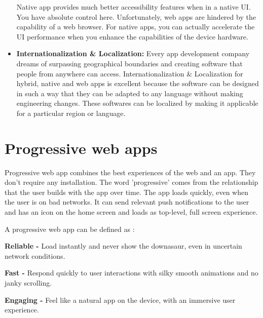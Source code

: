 \documentclass[14pt,a4paper,final]{extreport}
\begin{document}
\begin{itemize}
Native app provides much better accessibility features when in a native UI. You have absolute control here. Unfortunately, web apps are hindered by the capability of a web browser. For native apps, you can actually accelerate the UI performance when you enhance the capabilities of the device hardware.
    \item \textbf{Internationalization & Localization:}
Every app development company dreams of surpassing geographical boundaries and creating software that people from anywhere can access. Internationalization & Localization for hybrid, native and web apps is excellent because the software can be designed in such a way that they can be adapted to any language without making engineering changes. These softwares can be localized by making it applicable for a particular region or language.
\end{itemize}
\chapter{Progressive web apps}


\item \textbfA Progressive web app combines the best experiences of the web and an app. They don't require any installation. The word 'progressive' comes from the relationship that the user builds with the app over time. The app loads quickly, even when the user is on bad networks. It can send relevant push notifications to the user and has an icon on the home screen and loads as top-level, full screen experience.

\item A progressive web app can be defined as :

\item\textbf{Reliable -} Load instantly and never show the downasaur, even in uncertain network conditions.

\item \textbf{Fast -} Respond quickly to user interactions with silky smooth animations and no janky scrolling.
\item \textbf{Engaging -} Feel like a natural app on the device, with an immersive user experience.
\end{document}
